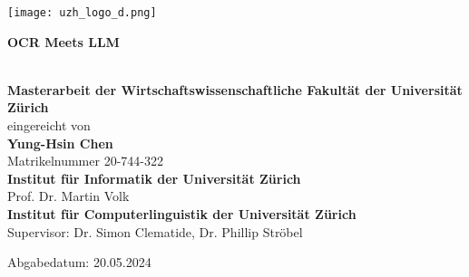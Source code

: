 \begin{titlepage}
\texttt{[image: uzh\_logo\_d.png]}\\ 

\begin{center}

\vspace{1.5cm}
\begin{Huge}\textbf{OCR Meets LLM}\end{Huge}\\

\vspace{2cm}
\vfill {\Large \textbf{Masterarbeit der Wirtschaftswissenschaftliche Fakultät der Universität Zürich}} \\%
\Large eingereicht von\\	\Large\textbf{Yung-Hsin Chen} \\ 
Matrikelnummer 20-744-322 \\

\vspace{4cm}  
\vfill {\large \textbf{Institut für Informatik der Universität Zürich}\\Prof. Dr. Martin Volk\\
\large \textbf{Institut für Computerlinguistik der Universität Zürich}\\
Supervisor: Dr. Simon Clematide, Dr. Phillip Ströbel}

\vspace{1cm}

\vfill{\large Abgabedatum: 20.05.2024}
\vspace{3cm}
\end{center}

\end{titlepage}

\newpage
